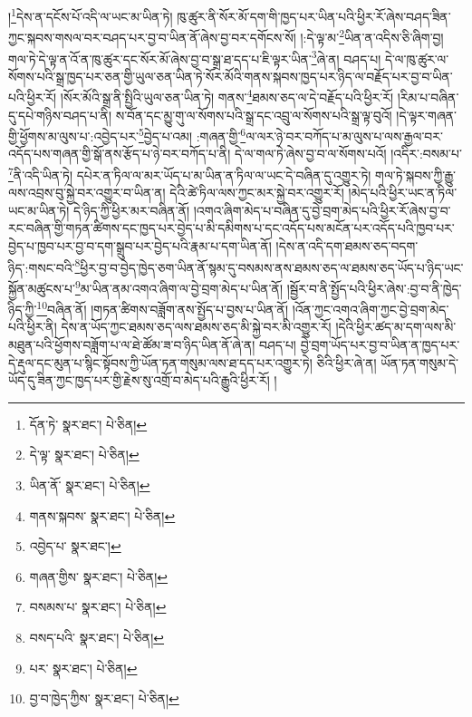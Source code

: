 །\footnote{དོན་ཏེ་  སྣར་ཐང་།  པེ་ཅིན། }དེས་ན་དངོས་པོ་འདི་ལ་ཡང་མ་ཡིན་ཏེ། ཁུ་ཚུར་ནི་སོར་མོ་དག་གི་ཁྱད་པར་ཡིན་པའི་ཕྱིར་རོ་ཞེས་བཤད་ཟིན་ཀྱང་སྐབས་གསལ་བར་བཤད་པར་བྱ་བ་ཡིན་ནོ་ཞེས་བྱ་བར་དགོངས་སོ། །:དེ་ལྟ་མ་\footnote{དེ་ལྟ་  སྣར་ཐང་།  པེ་ཅིན། }ཡིན་ན་འདིས་ཅི་ཞིག་བྱ། གལ་ཏེ་དེ་ལྟ་ན་འོ་ན་ཁུ་ཚུར་དང་སོར་མོ་ཞེས་བྱ་བ་སྒྲ་ཐ་དད་པ་ཇི་ལྟར་ཡིན་\footnote{ཡིན་ནོ་  སྣར་ཐང་།  པེ་ཅིན། }ཞེ་ན། བཤད་པ། དེ་ལ་ཁུ་ཚུར་ལ་སོགས་པའི་སྒྲ་ཁྱད་པར་ཅན་གྱི་ཡུལ་ཅན་ཡིན་ཏེ་སོར་མོའི་གནས་སྐབས་ཁྱད་པར་ཉིད་ལ་བརྗོད་པར་བྱ་བ་ཡིན་པའི་ཕྱིར་རོ། །སོར་མོའི་སྒྲ་ནི་སྤྱིའི་ཡུལ་ཅན་ཡིན་ཏེ། གནས་\footnote{གནས་སྐབས་  སྣར་ཐང་།  པེ་ཅིན། }ཐམས་ཅད་ལ་དེ་བརྗོད་པའི་ཕྱིར་རོ། །རིམ་པ་བཞིན་དུ་དཔེ་གཉིས་བཤད་པ་ནི། ས་བོན་དང་མྱུ་གུ་ལ་སོགས་པའི་སྒྲ་དང་འབྲུ་ལ་སོགས་པའི་སྒྲ་ལྟ་བུའོ། །དེ་ལྟར་གཞན་གྱི་ཕྱོགས་མ་ལུས་པ་:འབྱེད་པར་\footnote{འབྱེད་པ་  སྣར་ཐང་། }བྱེད་པ་འམ། :གཞན་གྱི་\footnote{གཞན་གྱིས་  སྣར་ཐང་།  པེ་ཅིན། }ལ་ལར་ཉེ་བར་བཀོད་པ་མ་ལུས་པ་ལས་རྒྱལ་བར་འདོད་པས་གཞན་གྱི་སྒོ་ནས་རྩོད་པ་ཉེ་བར་བཀོད་པ་ནི། དེ་ལ་གལ་ཏེ་ཞེས་བྱ་བ་ལ་སོགས་པའོ། །འདིར་:བསམ་པ་\footnote{བསམས་པ་  སྣར་ཐང་།  པེ་ཅིན། }ནི་འདི་ཡིན་ཏེ། དཔེར་ན་ཏིལ་ལ་མར་ཡོད་པ་མ་ཡིན་ན་ཏིལ་ལ་ཡང་དེ་བཞིན་དུ་འགྱུར་ཏེ། གལ་ཏེ་སྐབས་ཀྱི་རྒྱུ་ལས་འབྲས་བུ་སྐྱེ་བར་འགྱུར་བ་ཡིན་ན། དེའི་ཚེ་ཏིལ་ལས་ཀྱང་མར་སྐྱེ་བར་འགྱུར་རོ། །མེད་པའི་ཕྱིར་ཡང་ན་ཏིལ་ཡང་མ་ཡིན་ཏེ། དེ་ཉིད་ཀྱི་ཕྱིར་མར་བཞིན་ནོ། །འགའ་ཞིག་མེད་པ་བཞིན་དུ་བྱེ་བྲག་མེད་པའི་ཕྱིར་རོ་ཞེས་བྱ་བ་རང་བཞིན་གྱི་གཏན་ཚིགས་དང་ཁྱད་པར་བྱེད་པ་མི་དམིགས་པ་དང་འདོད་པས་མངོན་པར་འདོད་པའི་ཁྱབ་པར་བྱེད་པ་ཁྱབ་པར་བྱ་བ་དག་སྒྲུབ་པར་བྱེད་པའི་རྣམ་པ་དག་ཡིན་ནོ། །དེས་ན་འདི་དག་ཐམས་ཅད་བདག་ཉིད་:གསང་བའི་\footnote{བསད་པའི་  སྣར་ཐང་།  པེ་ཅིན། }ཕྱིར་བྱ་བ་བྱེད་ཁྱེད་ཅག་ཡིན་ནོ་སྙམ་དུ་བསམས་ནས་ཐམས་ཅད་ལ་ཐམས་ཅད་ཡོད་པ་ཉིད་ཡང་སྐྱོན་མཚུངས་པ་\footnote{པར་  སྣར་ཐང་།  པེ་ཅིན། }མ་ཡིན་ནམ་འགའ་ཞིག་ལ་བྱེ་བྲག་མེད་པ་ཡིན་ནོ། །སྦྱོར་བ་ནི་སྤྱོད་པའི་ཕྱིར་ཞེས་:བྱ་བ་ནི་ཁྱེད་ཉིད་ཀྱི་\footnote{བྱ་བ་ཁྱེད་ཀྱིས་  སྣར་ཐང་།  པེ་ཅིན། }བཞིན་ནོ། །གཏན་ཚིགས་བཟློག་ནས་སྤྱོད་པ་བྱས་པ་ཡིན་ནོ། །འོན་ཀྱང་འགའ་ཞིག་ཀྱང་བྱེ་བྲག་མེད་པའི་ཕྱིར་ནི། དེས་ན་ཡོད་ཀྱང་ཐམས་ཅད་ལས་ཐམས་ཅད་མི་སྐྱེ་བར་མི་འགྱུར་རོ། །དེའི་ཕྱིར་ཚད་མ་དག་ལས་མི་མཐུན་པའི་ཕྱོགས་བཟློག་པ་ལ་ཐེ་ཚོམ་ཟ་བ་ཉིད་ཡིན་ནོ་ཞེ་ན། བཤད་པ། བྱེ་བྲག་ཡོད་པར་བྱ་བ་ཡིན་ན་ཁྱད་པར་དེ་རྡུལ་དང་མུན་པ་སྙིང་སྟོབས་ཀྱི་ཡོན་ཏན་གསུམ་ལས་ཐ་དད་པར་འགྱུར་ཏེ། ཅིའི་ཕྱིར་ཞེ་ན། ཡོན་ཏན་གསུམ་དེ་ཡོད་དུ་ཟིན་ཀྱང་ཁྱད་པར་གྱི་རྗེས་སུ་འགྲོ་བ་མེད་པའི་རྒྱུའི་ཕྱིར་རོ། །
